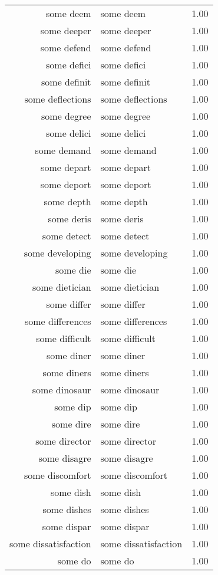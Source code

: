 \begin{table}[ht]
\begin{tabular}{rlr}
  some deem & some deem & 1.00 \\ 
  some deeper & some deeper & 1.00 \\ 
  some defend & some defend & 1.00 \\ 
  some defici & some defici & 1.00 \\ 
  some definit & some definit & 1.00 \\ 
  some deflections & some deflections & 1.00 \\ 
  some degree & some degree & 1.00 \\ 
  some delici & some delici & 1.00 \\ 
  some demand & some demand & 1.00 \\ 
  some depart & some depart & 1.00 \\ 
  some deport & some deport & 1.00 \\ 
  some depth & some depth & 1.00 \\ 
  some deris & some deris & 1.00 \\ 
  some detect & some detect & 1.00 \\ 
  some developing & some developing & 1.00 \\ 
  some die & some die & 1.00 \\ 
  some dietician & some dietician & 1.00 \\ 
  some differ & some differ & 1.00 \\ 
  some differences & some differences & 1.00 \\ 
  some difficult & some difficult & 1.00 \\ 
  some diner & some diner & 1.00 \\ 
  some diners & some diners & 1.00 \\ 
  some dinosaur & some dinosaur & 1.00 \\ 
  some dip & some dip & 1.00 \\ 
  some dire & some dire & 1.00 \\ 
  some director & some director & 1.00 \\ 
  some disagre & some disagre & 1.00 \\ 
  some discomfort & some discomfort & 1.00 \\ 
  some dish & some dish & 1.00 \\ 
  some dishes & some dishes & 1.00 \\ 
  some dispar & some dispar & 1.00 \\ 
  some dissatisfaction & some dissatisfaction & 1.00 \\ 
  some do & some do & 1.00 \\ 

\end{tabular}
\end{table}

